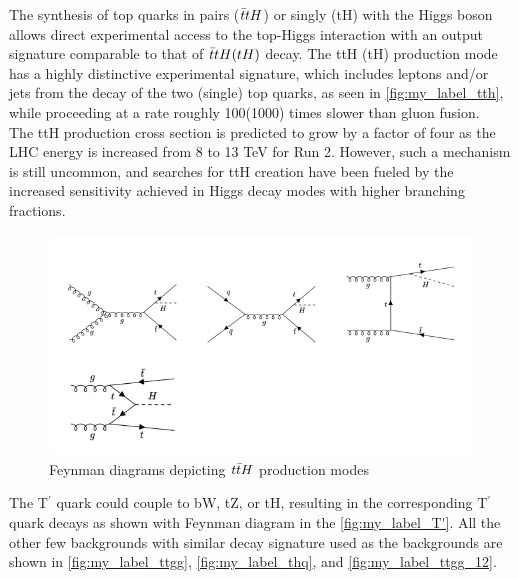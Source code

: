 The synthesis of top quarks in pairs ($\Bar{t}tH$)  or singly (tH) with the Higgs boson allows direct experimental access to the top-Higgs interaction with an output signature comparable to that of  $\Bar{t}tH (tH)$ decay. The ttH (tH) production mode has a highly distinctive experimental signature, which includes leptons and/or jets from the decay of the two (single) top quarks, as seen in \autoref{fig:my_label_tth}, while proceeding at a rate roughly 100(1000) times slower than gluon fusion.\\



The ttH production cross section is predicted to grow by a factor of four as the LHC energy is increased from 8 to 13 TeV for Run 2. However, such a mechanism is still uncommon, and searches for ttH creation have been fueled by the increased sensitivity achieved in Higgs decay modes with higher branching fractions. \\
\begin{figure}[H]
    \centering
    \includegraphics[scale=0.7]{figure_1/tth_1.png}
    \caption{Feynman diagrams depicting $t\Bar{t}H$ production modes}
    \label{fig:my_label_tth}
\end{figure}
The T$^'$ quark could couple to bW, tZ, or tH, resulting in the corresponding T$^'$ quark decays as shown with Feynman diagram in the \autoref{fig:my_label_T'}. All the other few backgrounds with similar decay signature used as the backgrounds are shown in \autoref{fig:my_label_ttgg}, \autoref{fig:my_label_thq}, and \autoref{fig:my_label_ttgg_12}.\\




